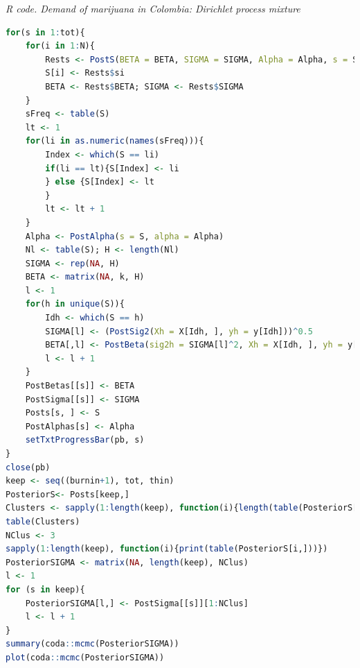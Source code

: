 \begin{tcolorbox}[enhanced,width=4.67in,center upper,
	fontupper=\large\bfseries,drop shadow southwest,sharp corners]
	\textit{R code. Demand of marijuana in Colombia: Dirichlet process mixture}
	\begin{VF}
		\begin{lstlisting}[language=R]
for(s in 1:tot){
	for(i in 1:N){
		Rests <- PostS(BETA = BETA, SIGMA = SIGMA, Alpha = Alpha, s = S, i = i)
		S[i] <- Rests$si
		BETA <- Rests$BETA; SIGMA <- Rests$SIGMA
	}
	sFreq <- table(S)
	lt <- 1
	for(li in as.numeric(names(sFreq))){
		Index <- which(S == li)
		if(li == lt){S[Index] <- li
		} else {S[Index] <- lt
		}
		lt <- lt + 1
	}
	Alpha <- PostAlpha(s = S, alpha = Alpha)
	Nl <- table(S); H <- length(Nl)
	SIGMA <- rep(NA, H)
	BETA <- matrix(NA, k, H)
	l <- 1
	for(h in unique(S)){
		Idh <- which(S == h)
		SIGMA[l] <- (PostSig2(Xh = X[Idh, ], yh = y[Idh]))^0.5
		BETA[,l] <- PostBeta(sig2h = SIGMA[l]^2, Xh = X[Idh, ], yh = y[Idh])
		l <- l + 1
	}
	PostBetas[[s]] <- BETA
	PostSigma[[s]] <- SIGMA
	Posts[s, ] <- S
	PostAlphas[s] <- Alpha
	setTxtProgressBar(pb, s)
}
close(pb)
keep <- seq((burnin+1), tot, thin)
PosteriorS<- Posts[keep,]
Clusters <- sapply(1:length(keep), function(i){length(table(PosteriorS[i,]))})
table(Clusters)
NClus <- 3
sapply(1:length(keep), function(i){print(table(PosteriorS[i,]))})
PosteriorSIGMA <- matrix(NA, length(keep), NClus)
l <- 1
for (s in keep){
	PosteriorSIGMA[l,] <- PostSigma[[s]][1:NClus]
	l <- l + 1
}
summary(coda::mcmc(PosteriorSIGMA))
plot(coda::mcmc(PosteriorSIGMA))
\end{lstlisting}
	\end{VF}
\end{tcolorbox}

